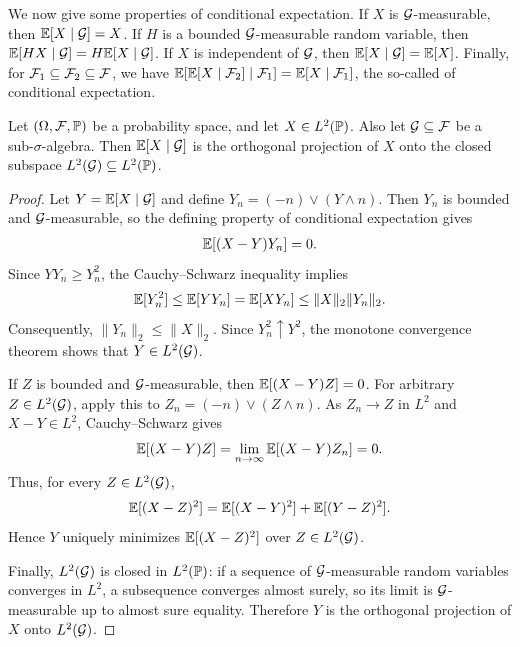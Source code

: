 We now give some properties of conditional expectation. If $X$ is $\mathcal{G}$-measurable, then $\mathbb{E}[X\mid \mathcal{G}] = X$. If $H$ is a bounded $\mathcal{G}$-measurable random variable, then $\mathbb{E}[HX\mid \mathcal{G}] = H\mathbb{E}[X\mid \mathcal{G}]$. If $X$ is independent of $\mathcal{G}$, then $\mathbb{E}[X\mid \mathcal{G}] = \mathbb{E}[X]$. Finally, for $\mathcal{F}_{1} \subseteq \mathcal{F}_{2} \subseteq \mathcal{F}$, we have $\mathbb{E}[\mathbb{E}[X\mid \mathcal{F}_{2}]\mid \mathcal{F}_{1}] = \mathbb{E}[X\mid \mathcal{F}_{1}]$, the so-called  of conditional expectation.

\begin{lemma}
    Let $(\Omega,\mathcal{F},\mathbb{P})$ be a probability space, and let $X \in L^{2}(\mathbb{P})$. Also let $\mathcal{G} \subseteq \mathcal{F}$ be a sub-$\sigma$-algebra. Then $\mathbb{E}[X\mid \mathcal{G}]$ is the orthogonal projection of $X$ onto the closed subspace $L^{2}(\mathcal{G}) \subseteq L^{2}(\mathbb{P})$.
\end{lemma}
\begin{proof}
    Let $Y = \mathbb{E}[X\mid \mathcal{G}]$ and define
    $Y_{n} = (-n) \vee (Y \wedge n)$. Then $Y_{n}$ is bounded and
    $\mathcal{G}$-measurable, so the defining property of conditional expectation
    gives
    \begin{align}
        \mathbb{E}[(X-Y)Y_{n}] = 0.
    \end{align}
    Since $YY_{n} \geq Y_{n}^{2}$, the Cauchy--Schwarz inequality implies
    \begin{align}
        \mathbb{E}[Y_{n}^{2}] \leq \mathbb{E}[YY_{n}] = \mathbb{E}[XY_{n}]
        \leq \|X\|_{2}\|Y_{n}\|_{2}.
    \end{align}
    Consequently, $\|Y_{n}\|_{2} \leq \|X\|_{2}$. Since
    $Y_{n}^{2} \uparrow Y^{2}$, the monotone convergence theorem shows that
    $Y \in L^{2}(\mathcal{G})$.

    If $Z$ is bounded and $\mathcal{G}$-measurable, then
    $\mathbb{E}[(X-Y)Z] = 0$. For arbitrary $Z \in L^{2}(\mathcal{G})$, apply this to
    $Z_{n} = (-n) \vee (Z \wedge n)$. As $Z_{n} \to Z$ in $L^{2}$ and
    $X-Y \in L^{2}$, Cauchy--Schwarz gives
    \begin{align}
        \mathbb{E}[(X-Y)Z] = \lim_{n\to\infty} \mathbb{E}[(X-Y)Z_{n}] = 0.
    \end{align}
    Thus, for every $Z \in L^{2}(\mathcal{G})$,
    \begin{align}
        \mathbb{E}[(X-Z)^{2}] = \mathbb{E}[(X-Y)^{2}] + \mathbb{E}[(Y-Z)^{2}].
    \end{align}
    Hence $Y$ uniquely minimizes $\mathbb{E}[(X-Z)^{2}]$ over $Z \in L^{2}(\mathcal{G})$.

    Finally, $L^{2}(\mathcal{G})$ is closed in $L^{2}(\mathbb{P})$: if a sequence of
    $\mathcal{G}$-measurable random variables converges in $L^{2}$, a subsequence
    converges almost surely, so its limit is $\mathcal{G}$-measurable up to almost
    sure equality. Therefore $Y$ is the orthogonal projection of $X$ onto
    $L^{2}(\mathcal{G})$.
\end{proof}
